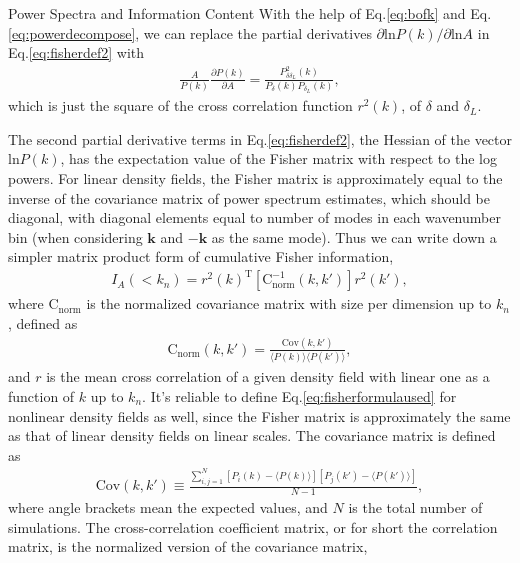 \begin{section}{Power Spectra and Information Content}
With the help of Eq.\ref{eq:bofk} and Eq.\ref{eq:powerdecompose}, we can replace 
the partial derivatives $\partial \mathrm{ln} P(k) / \partial \mathrm{ln} A$ in 
Eq.\ref{eq:fisherdef2} with 
\begin{align}
   \frac{A}{P(k)}\frac{\partial P(k)}{\partial A}=
   \frac{P_{\delta \delta_L}^2(k)}{P_\delta(k) P_{\delta_L}(k)},
\end{align}
which is just the square of the 
cross correlation function $r ^2 (k)$, of $\delta$ and $\delta_L$. 

The second partial derivative terms in Eq.\ref{eq:fisherdef2}, the Hessian 
of the vector $\mathrm{ln} P(k)$, has the expectation value of the Fisher 
matrix with respect to the log powers. For linear density fields, the 
Fisher matrix is approximately equal to the inverse of the covariance 
matrix of power spectrum estimates, which should be diagonal, with diagonal 
elements equal to number of modes in each wavenumber bin (when considering 
$\bm{k}$ and $-\bm{k}$ as the same mode). 
Thus we can write down a simpler matrix product form of cumulative 
Fisher information, 
\begin{align}
    I_A \left( < k_n\right) = r^2(k)^{\mathrm{T}} \left[ \mathrm{C^{-1}_{norm}} 
    ( k,k' )\right] r^2(k') ,
\label{eq:fisherformulaused}
\end{align}
where $\mathrm{C_{norm}}$ is the normalized covariance matrix with size per 
dimension up to $k_n$, defined as
\begin{align}
    \mathrm{C_{norm}} \left( k,k' \right)=\frac{\mathrm{Cov}(k,k')}
    {\langle P(k)\rangle\langle P(k')\rangle},
\end{align}
and $r$ is the mean cross correlation of a given density field with linear 
one as a function of $k$ up to $k_n$. 
It's reliable to define Eq.\ref{eq:fisherformulaused} for nonlinear density 
fields as well, since the Fisher matrix is approximately the same as that 
of linear density fields on linear scales. 
The covariance matrix is defined as 
\begin{align}
    \mathrm{Cov}\left(k,k'\right)\equiv \frac{\sum_{i,j=1}^{N}\left[ P_i \left( k \right) - 
    \langle P \left( k \right) \rangle \right]\left[ P_j \left( k' \right) - 
    \langle P \left( k' \right)\rangle \right]}{N-1},
\end{align}
where angle brackets mean the expected values, and $N$ is the total number 
of simulations.
The  cross-correlation coefficient matrix, or for short the correlation matrix, 
is the normalized version of the covariance matrix,

\end{section}
